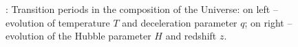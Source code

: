 \begin{figure}
\begin{minipage}{\linewidth}
\caption{: Transition periods in the composition of the Universe: on left -- evolution of temperature $T$ and deceleration parameter $q$; on right -- evolution of the Hubble parameter $H$ and redshift $z$. 
\label{fig:today} }
\end{minipage}
\end{figure}

